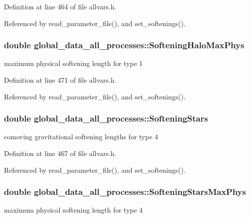 Definition at line 464 of file allvars.h.



Referenced by read\_\-parameter\_\-file(), and set\_\-softenings().

\hypertarget{structglobal__data__all__processes_a1d4f323715e8df4ea4be9296348cca25}{
\subsubsection[{SofteningHaloMaxPhys}]{\setlength{\rightskip}{0pt plus 5cm}double {\bf global\_\-data\_\-all\_\-processes::SofteningHaloMaxPhys}}}
\label{structglobal__data__all__processes_a1d4f323715e8df4ea4be9296348cca25}
maximum physical softening length for type 1 

Definition at line 471 of file allvars.h.



Referenced by read\_\-parameter\_\-file(), and set\_\-softenings().

\hypertarget{structglobal__data__all__processes_a5502dc85fd165d33e9ba8d0f8c01867c}{
\subsubsection[{SofteningStars}]{\setlength{\rightskip}{0pt plus 5cm}double {\bf global\_\-data\_\-all\_\-processes::SofteningStars}}}
\label{structglobal__data__all__processes_a5502dc85fd165d33e9ba8d0f8c01867c}
comoving gravitational softening lengths for type 4 

Definition at line 467 of file allvars.h.



Referenced by read\_\-parameter\_\-file(), and set\_\-softenings().

\hypertarget{structglobal__data__all__processes_a7ace4652c6c05275e4fa28dfe6fb374e}{
\subsubsection[{SofteningStarsMaxPhys}]{\setlength{\rightskip}{0pt plus 5cm}double {\bf global\_\-data\_\-all\_\-processes::SofteningStarsMaxPhys}}}
\label{structglobal__data__all__processes_a7ace4652c6c05275e4fa28dfe6fb374e}
maximum physical softening length for type 4 

